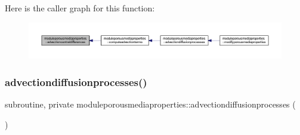 Here is the caller graph for this function\+:\nopagebreak
\begin{figure}[H]
\begin{center}
\leavevmode
\includegraphics[width=350pt]{namespacemoduleporousmediaproperties_a07904791ddeab6650d5a3ed4ee8eca5d_icgraph}
\end{center}
\end{figure}
\mbox{\label{namespacemoduleporousmediaproperties_ab176bef10683035ac59beb9b6b893728}} 
\subsubsection{\texorpdfstring{advectiondiffusionprocesses()}{advectiondiffusionprocesses()}}
{\footnotesize\ttfamily subroutine, private moduleporousmediaproperties\+::advectiondiffusionprocesses (\begin{DoxyParamCaption}{ }\end{DoxyParamCaption})\hspace{0.3cm}{\ttfamily [private]}}

